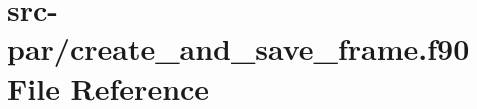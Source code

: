 \hypertarget{create__and__save__frame_8f90}{\section{src-\/par/create\-\_\-and\-\_\-save\-\_\-frame.f90 File Reference}
\label{create__and__save__frame_8f90}
}
